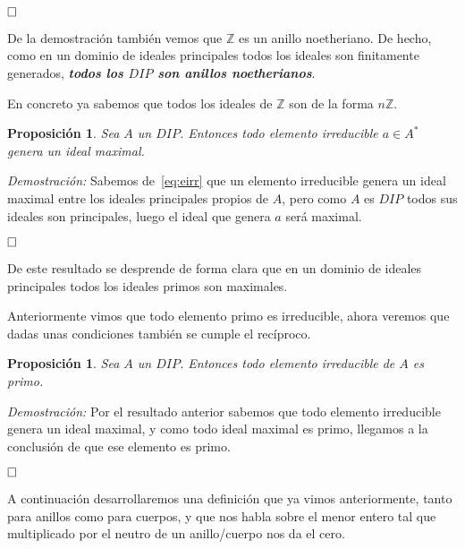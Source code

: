 \documentclass[12pt]{article}
\newtheorem{proposition}[theorem]{Proposición}
\begin{document}
$\hfill \square$

De la demostración también vemos que $\mathbb{Z}$ es un anillo noetheriano. De hecho, como en un dominio de ideales principales todos los ideales son finitamente generados, \textbf{\textit{todos los $DIP$ son anillos noetherianos}}.

En concreto ya sabemos que todos los ideales de $\mathbb{Z}$ son de la forma $n\mathbb{Z}$.

\begin{proposition} Sea $A$ un $DIP$. Entonces todo elemento irreducible $a \in A^{\ast}$ genera un ideal maximal.
\end{proposition}
\emph{Demostración: }Sabemos de~\ref{eq:eirr} que un elemento irreducible genera un ideal maximal entre los ideales principales propios de $A$, pero como $A$ es $DIP$ todos sus ideales son principales, luego el ideal que genera $a$ será maximal.

$\hfill \square$

De este resultado se desprende de forma clara que en un dominio de ideales principales todos los ideales primos son maximales.

Anteriormente vimos que todo elemento primo es irreducible, ahora veremos que dadas unas condiciones también se cumple el recíproco.

\begin{proposition}\label{pregauss0} Sea $A$ un $DIP$. Entonces todo elemento irreducible de $A$ es primo.
\end{proposition}
\emph{Demostración: }Por el resultado anterior sabemos que todo elemento irreducible genera un ideal maximal, y como todo ideal maximal es primo, llegamos a la conclusión de que ese elemento es primo.

$\hfill \square$


A continuación desarrollaremos una definición que ya vimos anteriormente, tanto para anillos como para cuerpos, y que nos habla sobre el menor entero tal que multiplicado por el neutro de un anillo/cuerpo nos da el cero. 
\end{document}
